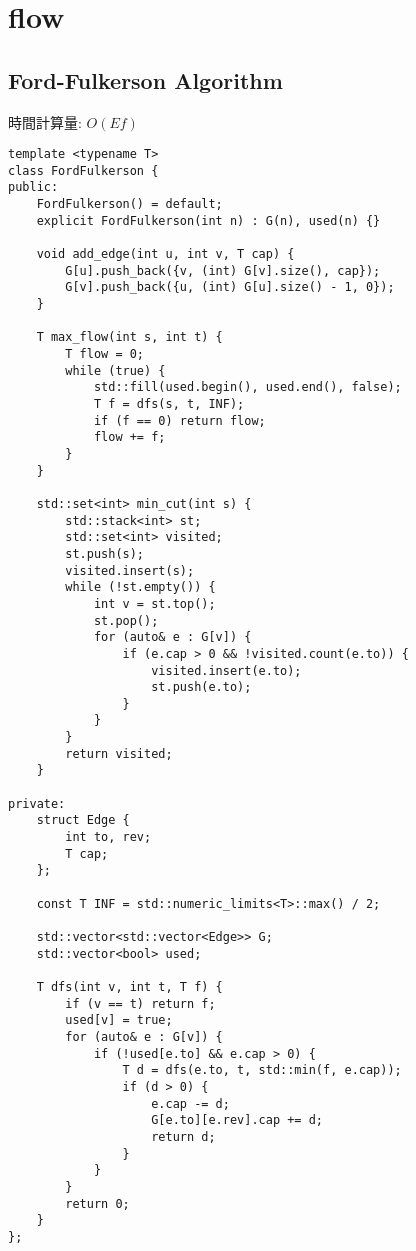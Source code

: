 \section{flow}

\subsection{Ford-Fulkerson Algorithm}

\begin{small}
時間計算量: $O(Ef)$
\end{small}

\begin{lstlisting}
template <typename T>
class FordFulkerson {
public:
    FordFulkerson() = default;
    explicit FordFulkerson(int n) : G(n), used(n) {}

    void add_edge(int u, int v, T cap) {
        G[u].push_back({v, (int) G[v].size(), cap});
        G[v].push_back({u, (int) G[u].size() - 1, 0});
    }

    T max_flow(int s, int t) {
        T flow = 0;
        while (true) {
            std::fill(used.begin(), used.end(), false);
            T f = dfs(s, t, INF);
            if (f == 0) return flow;
            flow += f;
        }
    }

    std::set<int> min_cut(int s) {
        std::stack<int> st;
        std::set<int> visited;
        st.push(s);
        visited.insert(s);
        while (!st.empty()) {
            int v = st.top();
            st.pop();
            for (auto& e : G[v]) {
                if (e.cap > 0 && !visited.count(e.to)) {
                    visited.insert(e.to);
                    st.push(e.to);
                }
            }
        }
        return visited;
    }

private:
    struct Edge {
        int to, rev;
        T cap;
    };

    const T INF = std::numeric_limits<T>::max() / 2;

    std::vector<std::vector<Edge>> G;
    std::vector<bool> used;

    T dfs(int v, int t, T f) {
        if (v == t) return f;
        used[v] = true;
        for (auto& e : G[v]) {
            if (!used[e.to] && e.cap > 0) {
                T d = dfs(e.to, t, std::min(f, e.cap));
                if (d > 0) {
                    e.cap -= d;
                    G[e.to][e.rev].cap += d;
                    return d;
                }
            }
        }
        return 0;
    }
};
\end{lstlisting}

